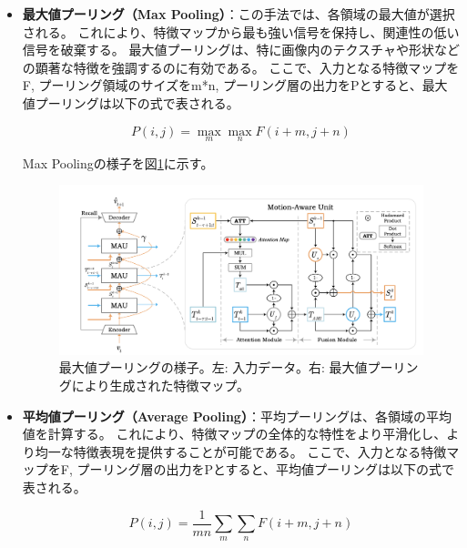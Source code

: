         \begin{itemize}
        \item \textbf{最大値プーリング（Max Pooling）}：この手法では、各領域の最大値が選択される。
        これにより、特徴マップから最も強い信号を保持し、関連性の低い信号を破棄する。
        最大値プーリングは、特に画像内のテクスチャや形状などの顕著な特徴を強調するのに有効である。
        ここで、入力となる特徴マップをF, プーリング領域のサイズをm*n, プーリング層の出力をPとすると、最大値プーリングは以下の式で表される。

        \begin{equation}
          P(i, j) = \max_{m}\max_{n}F(i+m, j+n)
        \end{equation}
        
        Max Poolingの様子を図\ref{fig:maxpooling}に示す。
        \begin{figure}[h]
          \centering
          \includegraphics[width=\textwidth]{figures/mau.png}
          \caption{最大値プーリングの様子。左: 入力データ。右: 最大値プーリングにより生成された特徴マップ。}
          \label{fig:maxpooling}
        \end{figure}

        \item \textbf{平均値プーリング（Average Pooling）}：平均プーリングは、各領域の平均値を計算する。
        これにより、特徴マップの全体的な特性をより平滑化し、より均一な特徴表現を提供することが可能である。
        ここで、入力となる特徴マップをF, プーリング層の出力をPとすると、平均値プーリングは以下の式で表される。

        \begin{equation}
          P(i, j) = \frac{1}{mn}\sum_{m}\sum_{n}F(i+m, j+n)
        \end{equation}
        
        \end{itemize}
      

